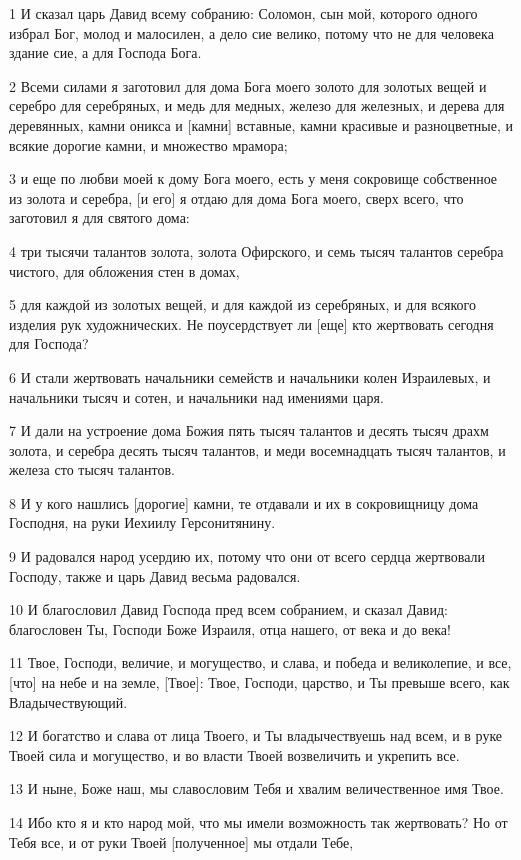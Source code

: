 \par 1 И сказал царь Давид всему собранию: Соломон, сын мой, которого одного избрал Бог, молод и малосилен, а дело сие велико, потому что не для человека здание сие, а для Господа Бога.
\par 2 Всеми силами я заготовил для дома Бога моего золото для золотых вещей и серебро для серебряных, и медь для медных, железо для железных, и дерева для деревянных, камни оникса и [камни] вставные, камни красивые и разноцветные, и всякие дорогие камни, и множество мрамора;
\par 3 и еще по любви моей к дому Бога моего, есть у меня сокровище собственное из золота и серебра, [и его] я отдаю для дома Бога моего, сверх всего, что заготовил я для святого дома:
\par 4 три тысячи талантов золота, золота Офирского, и семь тысяч талантов серебра чистого, для обложения стен в домах,
\par 5 для каждой из золотых вещей, и для каждой из серебряных, и для всякого изделия рук художнических. Не поусердствует ли [еще] кто жертвовать сегодня для Господа?
\par 6 И стали жертвовать начальники семейств и начальники колен Израилевых, и начальники тысяч и сотен, и начальники над имениями царя.
\par 7 И дали на устроение дома Божия пять тысяч талантов и десять тысяч драхм золота, и серебра десять тысяч талантов, и меди восемнадцать тысяч талантов, и железа сто тысяч талантов.
\par 8 И у кого нашлись [дорогие] камни, те отдавали и их в сокровищницу дома Господня, на руки Иехиилу Герсонитянину.
\par 9 И радовался народ усердию их, потому что они от всего сердца жертвовали Господу, также и царь Давид весьма радовался.
\par 10 И благословил Давид Господа пред всем собранием, и сказал Давид: благословен Ты, Господи Боже Израиля, отца нашего, от века и до века!
\par 11 Твое, Господи, величие, и могущество, и слава, и победа и великолепие, и все, [что] на небе и на земле, [Твое]: Твое, Господи, царство, и Ты превыше всего, как Владычествующий.
\par 12 И богатство и слава от лица Твоего, и Ты владычествуешь над всем, и в руке Твоей сила и могущество, и во власти Твоей возвеличить и укрепить все.
\par 13 И ныне, Боже наш, мы славословим Тебя и хвалим величественное имя Твое.
\par 14 Ибо кто я и кто народ мой, что мы имели возможность так жертвовать? Но от Тебя все, и от руки Твоей [полученное] мы отдали Тебе,
